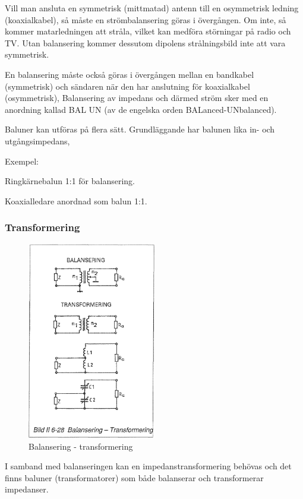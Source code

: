 Vill man ansluta en symmetrisk (mittmatad) antenn till en osymmetrisk
ledning (koaxialkabel), så måste en strömbalansering göras i
övergången. Om inte, så kommer matarledningen att stråla, vilket kan
medföra störningar på radio och TV. Utan balansering kommer dessutom
dipolens strålningsbild inte att vara symmetrisk.

En balansering måste också göras i övergången mellan en bandkabel
(symmetrisk) och sändaren när den har anslutning för koaxialkabel
(osymmetrisk), Balansering av impedans och därmed ström sker med en
anordning kallad BAL UN (av de engelska orden BALanced-UNbalanced).

Baluner kan utföras på flera sätt. Grundläggande har balunen lika in-
och utgångsimpedans,

Exempel:

Ringkärnebalun 1:1 för balansering.

Koaxialledare anordnad som balun 1:1.

\subsubsection{Transformering}

\begin{figure}
  \includegraphics[width=0.5\textwidth]{images/bild_2_6-28}
  \caption{Balansering - transformering}
  \label{fig:bildII6-28}
\end{figure}

I samband med balanseringen kan en impedanstransformering behövas och
det finns baluner (transformatorer) som både balanserar och
transformerar impedanser.

